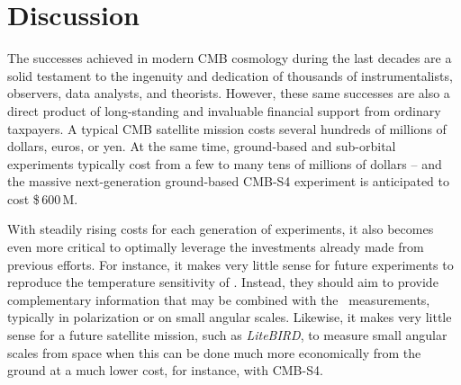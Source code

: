 \documentclass[twocolumn]{aa}
\begin{document}



\section{Discussion}
\label{sec:conclusions}

The successes achieved in modern CMB cosmology during the last decades are a solid testament to the ingenuity and dedication of thousands of instrumentalists, observers, data analysts, and theorists. However, these same successes are also a direct product of long-standing and invaluable financial support from ordinary taxpayers. A typical CMB satellite mission costs several hundreds of millions of dollars, euros, or yen. At the same time, ground-based and sub-orbital experiments typically cost from a few to many tens of millions of dollars -- and the massive next-generation ground-based CMB-S4 experiment is anticipated to cost \$\,600\,M.

With steadily rising costs for each generation of experiments, it also becomes even more critical to optimally leverage the investments already made from previous efforts. For instance, it makes very little sense for future experiments to reproduce the temperature sensitivity of \Planck. Instead, they should aim to provide complementary information that may be combined with the \Planck\ measurements, typically in polarization or on small angular scales. Likewise, it makes very little sense for a future satellite mission, such as \textit{LiteBIRD}, to measure small angular scales from space when this can be done much more economically from the ground at a much lower cost, for instance, with CMB-S4.
\end{document}

